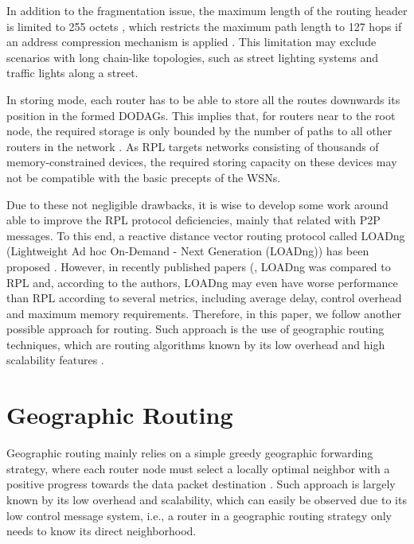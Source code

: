 \documentclass[final,authoryear,3p,twocolumn]{elsarticle}
\begin{document}
In addition to the fragmentation issue, the maximum length of the routing header is limited to 255 octets \citep{RFC4944}, which restricts the maximum path length to 127 hops if an address compression mechanism is applied \citep{herberg}. This limitation may exclude scenarios with long chain-like topologies, such as street lighting systems and traffic lights along a street.

In storing mode, each router has to be able to store all the routes downwards its position in the formed DODAGs. This implies that, for routers near to the root node, the required storage is only bounded by the number of paths to all other routers in the network \citep{RPL_observations}. As RPL targets networks consisting of thousands of memory-constrained devices, the required storing capacity on these devices may not be compatible with the basic precepts of the WSNs.

Due to these not negligible drawbacks, it is wise to develop some work around able to improve the RPL protocol deficiencies, mainly that related with P2P messages. To this end, a reactive distance vector routing protocol called LOADng (Lightweight Ad hoc On-Demand - Next Generation (LOADng)) has been proposed \citep{LOADng_2012}. However, in recently published papers (\citep{Tripathi2014, Vucinic_2013}, LOADng was compared to RPL  and, according to the authors, LOADng may even have worse performance than RPL according to several metrics, including average delay, control overhead and maximum memory requirements. Therefore, in this paper, we follow another possible approach for routing. Such approach is the use of geographic routing techniques, which are routing algorithms known by its low overhead and high scalability features \citep{Karp_GPSR_2000, GOAFR_2008, survey_2007}.


\section{Geographic Routing}
\label{secGeographicRouting}

Geographic routing mainly relies on a simple greedy geographic forwarding strategy, where each router node must select a locally optimal neighbor with a positive progress towards the data packet destination \citep{survey_2007}. Such approach is largely known by its low overhead and scalability, which can easily be observed due to its low control message system, i.e., a router in a geographic routing strategy only needs to know its direct neighborhood.
\end{document}
